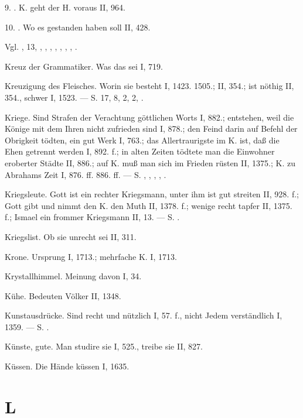 9. . K. geht der H. voraus II, 964.

10. . Wo es gestanden haben soll II, 428.

Vgl. ,  13, , , , , , , , .

Kreuz der Grammatiker. Was das sei I, 719.

Kreuzigung des Fleisches. Worin sie besteht I, 1423. 1505.; II, 354.; ist nöthig II, 354., schwer I, 1523. — S.  17,  8,  2,  2, .

Kriege. Sind Strafen der Verachtung göttlichen Worts I, 882.; entstehen, weil die Könige mit dem Ihren nicht zufrieden sind I, 878.; den Feind darin auf Befehl der Obrigkeit tödten, ein gut Werk I, 763.; das Allertraurigste im K. ist, daß die Ehen getrennt werden I, 892. f.; in alten Zeiten tödtete man die Einwohner eroberter Städte II, 886.; auf K. muß man sich im Frieden rüsten II, 1375.; K. zu Abrahams Zeit I, 876. ff. 886. ff. — S. , , , , .

Kriegsleute. Gott ist ein rechter Kriegsmann, unter ihm ist gut streiten II, 928. f.; Gott gibt und nimmt den K. den Muth II, 1378. f.; wenige recht tapfer II, 1375. f.; Ismael ein frommer Kriegsmann II, 13. — S. .

Kriegslist. Ob sie unrecht sei II, 311.

Krone. Ursprung I, 1713.; mehrfache K. I, 1713.

Krystallhimmel. Meinung davon I, 34.

Kühe. Bedeuten Völker II, 1348.

Kunstausdrücke. Sind recht und nützlich I, 57. f., nicht Jedem verständlich I, 1359. — S. .

Künste, gute. Man studire sie I, 525., treibe sie II, 827.

Küssen. Die Hände küssen I, 1635.

\section{L}

